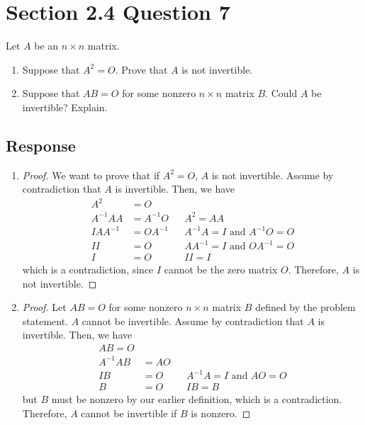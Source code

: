 \documentclass[13pt]{article}
\begin{document}
\newpage
\section*{Section 2.4 Question 7}
Let $A$ be an $n \times n$ matrix.
\begin{enumerate}[label=(\alph*),leftmargin=*]
\item Suppose that $A^2 = O$. Prove that $A$ is not invertible.
\item Suppose that $AB = O$ for some nonzero $n \times n$ matrix $B$. Could $A$ be invertible? Explain.
\end{enumerate}
\subsection*{Response}
\begin{enumerate}[label=(\alph*),leftmargin=*]
\item
  \begin{proof}
    We want to prove that if $A^2 = O$, $A$ is not invertible. Assume by contradiction that $A$ is invertible. Then, we have
    \begin{align*}
      A^2 &= O \\
      A^{-1}AA &= A^{-1}O && A^2 = AA \\
      IAA^{-1} &= OA^{-1} && A^{-1}A = I \text{ and } A^{-1}O = O \\
      II &= O && AA^{-1} = I \text{ and } OA^{-1} = O \\
      I &= O && II = I
    \end{align*}
    which is a contradiction, since $I$ cannot be the zero matrix $O$. Therefore, $A$ is not invertible.
  \end{proof}
\item
  \begin{proof}
    Let $AB = O$ for some nonzero $n \times n$ matrix $B$ defined by the problem statement. $A$ cannot be invertible. Assume by contradiction that $A$ is invertible. Then, we have
    \begin{align*}
      AB = O \\
      A^{-1}AB &= AO \\
      IB &= O && A^{-1}A = I \text{ and } AO = O \\
      B &= O && IB = B
    \end{align*}
    but $B$ must be nonzero by our earlier definition, which is a contradiction. Therefore, $A$ cannot be invertible if $B$ is nonzero.
  \end{proof}
  
\end{enumerate}
\end{document}
